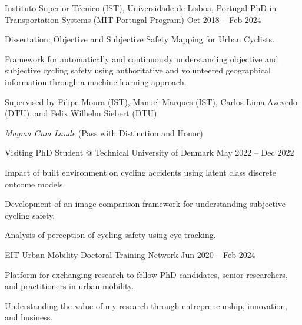   \cventry
    {Instituto Superior Técnico (IST), Universidade de Lisboa, Portugal} %
    {PhD in Transportation Systems (MIT Portugal Program)} %
    {Oct 2018 – Feb 2024} %
    {
      \begin{cvitems} %
        \item {\underline{Dissertation:} Objective and Subjective Safety Mapping for Urban Cyclists.}
        \item {Framework for automatically and continuously understanding objective and subjective cycling safety using authoritative and volunteered geographical information through a machine learning approach.}
        \item {Supervised by Filipe Moura (IST), Manuel Marques (IST), Carlos Lima Azevedo (DTU), and Felix Wilhelm Siebert (DTU)}
      \end{cvitems}
    }
    {
        \textit{Magma Cum Laude} (Pass with Distinction and Honor)
    }

  \cventryinner
    {Visiting PhD Student @ Technical University of Denmark} %
    {May 2022 – Dec 2022} %
    {
      \begin{cvitems} %
        \item {Impact of built environment on cycling accidents using latent class discrete outcome models.}
        \item {Development of an image comparison framework for understanding subjective cycling safety.}
        \item {Analysis of perception of cycling safety using eye tracking.}
      \end{cvitems}
    }
    {
    }

  \cventryinner
    {EIT Urban Mobility Doctoral Training Network} %
    {Jun 2020 – Feb 2024} %
    {
      \begin{cvitems} %
        \item {Platform for exchanging research to fellow PhD candidates, senior researchers, and practitioners in urban mobility.}
        \item {Understanding the value of my research through entrepreneurship, innovation, and business.}
      \end{cvitems}
    }
    {
    }


